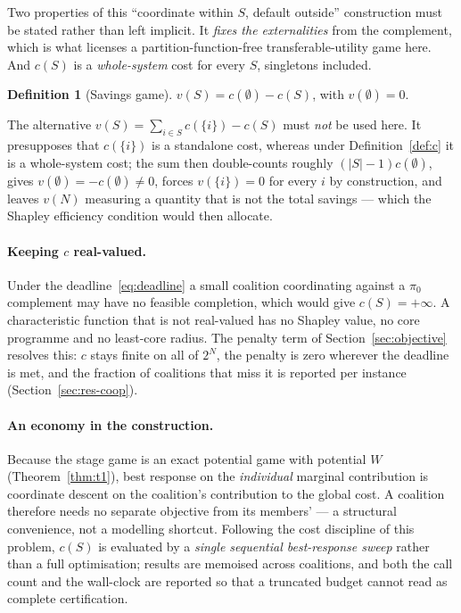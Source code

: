 \documentclass[preprint, 3p, review, 12pt]{elsarticle}
\theoremstyle{definition}
\newtheorem{definition}[theorem]{Definition}
\begin{document}
Two properties of this ``coordinate within $S$, default outside'' construction must be stated
rather than left implicit. It \emph{fixes the externalities} from the complement, which is
what licenses a partition-function-free transferable-utility game here. And $c(S)$ is a
\emph{whole-system} cost for every $S$, singletons included.

\begin{definition}[Savings game]
\label{def:v}
$v(S) = c(\emptyset)-c(S)$, with $v(\emptyset)=0$.
\end{definition}

The alternative $v(S)=\sum_{i\in S}c(\{i\}) - c(S)$ must \emph{not} be used here. It
presupposes that $c(\{i\})$ is a standalone cost, whereas under Definition~\ref{def:c} it is
a whole-system cost; the sum then double-counts roughly $(|S|-1)c(\emptyset)$, gives
$v(\emptyset)=-c(\emptyset)\neq0$, forces $v(\{i\})=0$ for every $i$ by construction, and
leaves $v(N)$ measuring a quantity that is not the total savings --- which the Shapley
efficiency condition would then allocate.

\paragraph{Keeping $c$ real-valued.} Under the deadline~\eqref{eq:deadline} a small coalition
coordinating against a $\pi_0$ complement may have no feasible completion, which would give
$c(S)=+\infty$. A characteristic function that is not real-valued has no Shapley value, no
core programme and no least-core radius. The penalty term of Section~\ref{sec:objective}
resolves this: $c$ stays finite on all of $2^{N}$, the penalty is zero wherever the deadline
is met, and the fraction of coalitions that miss it is reported per instance
(Section~\ref{sec:res-coop}).

\paragraph{An economy in the construction.} Because the stage game is an exact potential game
with potential $W$ (Theorem~\ref{thm:t1}), best response on the \emph{individual} marginal
contribution is coordinate descent on the coalition's contribution to the global cost. A
coalition therefore needs no separate objective from its members' --- a structural
convenience, not a modelling shortcut. Following the cost discipline of this problem, $c(S)$
is evaluated by a \emph{single sequential best-response sweep} rather than a full
optimisation; results are memoised across coalitions, and both the call count and the
wall-clock are reported so that a truncated budget cannot read as complete certification.
\end{document}

